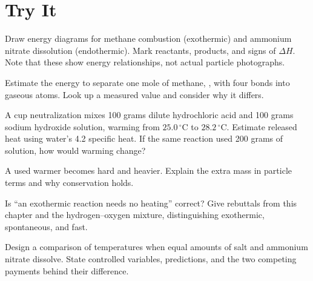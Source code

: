 \section*{Try It}

\begin{sikaoti}
\item Draw energy diagrams for methane combustion (exothermic) and ammonium nitrate dissolution (endothermic). Mark reactants, products, and signs of $\Delta H$. Note that these show energy relationships, not actual particle photographs.
\item Estimate the energy to separate one mole of methane, , with four  bonds into gaseous atoms. Look up a measured value and consider why it differs.
\item A cup neutralization mixes 100 grams dilute hydrochloric acid and 100 grams sodium hydroxide solution, warming from $25.0\,^{\circ}\mathrm{C}$ to $28.2\,^{\circ}\mathrm{C}$. Estimate released heat using water's 4.2  specific heat. If the same reaction used 200 grams of solution, how would warming change?
\item A used warmer becomes hard and heavier. Explain the extra mass in particle terms and why conservation holds.
\item Is ``an exothermic reaction needs no heating'' correct? Give rebuttals from this chapter and the hydrogen--oxygen mixture, distinguishing exothermic, spontaneous, and fast.
\item Design a comparison of temperatures when equal amounts of salt and ammonium nitrate dissolve. State controlled variables, predictions, and the two competing payments behind their difference.
\end{sikaoti}
